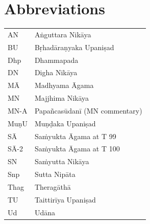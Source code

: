 \documentclass[10pt, openright]{book}
\begin{document}
\section{Abbreviations}
\bgroup
\def\arraystretch{1.2}
\begin{tabular}{ll}
AN & Aṅguttara Nikāya \\
BU & Bṛhadāraṇyaka Upaniṣad \\
Dhp & Dhammapada \\
DN & Digha Nikāya \\
MĀ & Madhyama Āgama \\
MN & Majjhima Nikāya \\
MN-A & Papañcasūdanī (MN commentary) \\
MuṇU & Muṇḍaka Upaniṣad \\
SĀ & Saṁyukta Āgama at T 99 \\
SĀ-2 & Saṁyukta Āgama at T 100 \\
SN & Saṁyutta Nikāya \\
Snp & Sutta Nipāta \\
Thag & Theragāthā \\
TU & Taittirīya Upaniṣad \\
Ud & Udāna \\

\end{tabular}\\
\egroup\\






\end{document}
